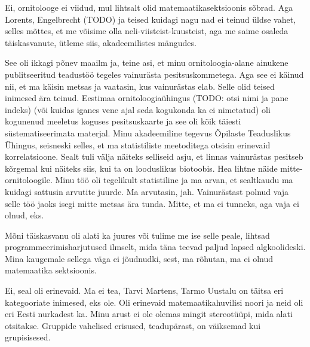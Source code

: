 
Ei, ornitolooge ei viidud, mul lihtsalt olid matemaatikasektsioonis sõbrad. Aga 
Lorents, Engelbrecht (TODO) ja teised kuidagi nagu 
nad ei teinud üldse vahet, selles mõttes, et me võisime olla 
neli-viisteist-kuusteist, aga me saime osaleda täiskasvanute, ütleme siis, 
akadeemilistes mängudes.


See oli ikkagi põnev maailm ja, teine asi, et minu ornitoloogia-alane ainukene 
publitseeritud teadustöö tegeles vainurästa pesitsuskommetega. Aga see ei 
käinud nii, et ma käisin metsas ja vaatasin, kus vainurästas elab. Selle olid 
teised inimesed ära teinud. Eestimaa ornitoloogiaühingus (TODO: otsi nimi ja 
pane indeks) (või kuidas iganes vene ajal seda kogukonda ka ei nimetatud) oli 
kogunenud meeletus koguses pesitsuskaarte ja see oli kõik täiesti 
süstematiseerimata materjal. Minu akadeemiline tegevus Õpilaste Teaduslikus 
Ühingus, seisneski selles, et ma statistiliste meetoditega otsisin erinevaid 
korrelatsioone. Sealt tuli välja näiteks selliseid asju, et linnas vainurästas 
pesitseb kõrgemal kui näiteks siis, kui ta on looduslikus biotoobis. Hea lihtne 
näide mitte-ornitoloogile. Minu töö oli tegelikult statistiline ja ma arvan, et 
 sealtkaudu ma kuidagi sattusin arvutite juurde. Ma arvutasin, jah. 
Vainurästast polnud vaja selle töö jaoks isegi mitte metsas ära tunda. Mitte, 
et ma ei tunneks, aga vaja ei olnud, eks.


Mõni täiskasvanu oli alati ka juures  või tulime me ise selle peale, lihtsad 
programmeerimisharjutused ilmselt, mida täna teevad paljud lapsed 
algkoolideski. Mina kaugemale sellega väga ei jõudnudki, sest, ma rõhutan, ma 
ei olnud matemaatika sektsioonis.


Ei, seal oli erinevaid. Ma ei tea, Tarvi Martens, 
Tarmo Uustalu on täitsa eri kategooriate inimesed, 
eks ole. Oli  erinevaid matemaatikahuvilisi noori ja neid oli eri Eesti  
nurkadest ka. Minu arust ei ole olemas mingit stereotüüpi, mida alati 
otsitakse. Gruppide vahelised erisused, teadupärast, on väiksemad kui 
grupisisesed.


